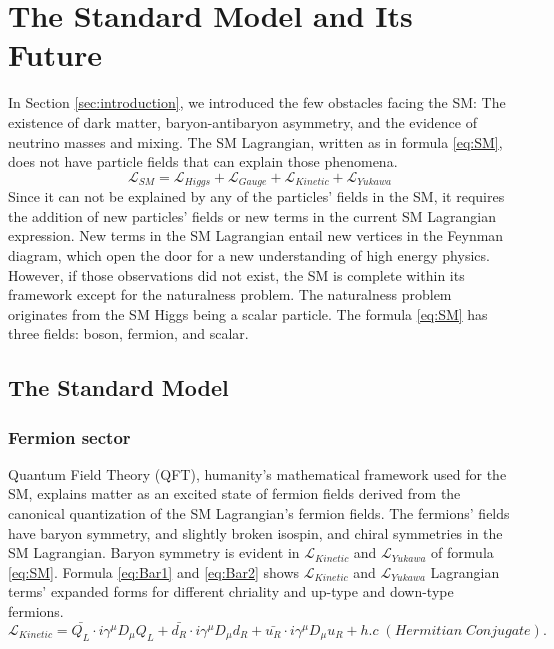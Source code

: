 \chapter{The Standard Model and Its Future}\label{sec:theory}
In Section \ref{sec:introduction}, we introduced the few obstacles facing the SM: The existence of dark matter, baryon-antibaryon asymmetry, and the evidence of neutrino masses and mixing.
The SM Lagrangian, written as in formula \ref{eq:SM}, does not have particle fields that can explain those phenomena.
\begin{equation}
\label{eq:SM}
\mathcal{L}_{SM} = \mathcal{L}_{Higgs}+\mathcal{L}_{Gauge}+\mathcal{L}_{Kinetic}+\mathcal{L}_{Yukawa}
\end{equation}
Since it can not be explained by any of the particles' fields in the SM, it requires the addition of new particles' fields or new terms in the current SM Lagrangian expression.
New terms in the SM Lagrangian entail new vertices in the Feynman diagram, which open the door for a new understanding of high energy physics.
However, if those observations did not exist, the SM is complete within its framework except for the naturalness problem.
The naturalness problem originates from the SM Higgs being a scalar particle.
The formula \ref{eq:SM} has three fields: boson, fermion, and scalar.
\section{The Standard Model}
\subsection{Fermion sector}

Quantum Field Theory (QFT), humanity's mathematical framework used for the SM, explains matter as an excited state of fermion fields derived from the canonical quantization of the SM Lagrangian's fermion fields.
The fermions' fields have baryon symmetry, and slightly broken isospin, and chiral symmetries in the SM Lagrangian.
Baryon symmetry is evident in $\mathcal{L}_{Kinetic}$ and $\mathcal{L}_{Yukawa}$ of formula \ref{eq:SM}. 
Formula \ref{eq:Bar1} and \ref{eq:Bar2} shows $\mathcal{L}_{Kinetic}$ and $\mathcal{L}_{Yukawa}$ Lagrangian terms' expanded forms for different chriality and up-type and down-type fermions.
\begin{equation}
\label{eq:Bar1}
	\mathcal{L}_{Kinetic}  = \bar{Q_{L}}\cdot i\gamma^{\mu}D_{\mu}Q_{L}+\bar{d_{R}}\cdot i\gamma^{\mu}D_{\mu}d_{R}+\bar{u_{R}}\cdot i\gamma^{\mu}D_{\mu}u_{R}+h.c\;(Hermitian\;Conjugate).
\end{equation}

